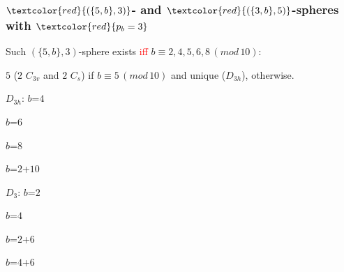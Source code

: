 \documentclass{beamer}
\begin{document}
\begin{frame}\frametitle{$\textcolor{red}{(\{5,b\},3)}$- 
and $\textcolor{red}{(\{3,b\},5)}$-spheres with
$\textcolor{red}{p_b=3}$}
\vspace{-3mm}
  
Such ${(\{5,b\},3)}$-sphere  exists
\textcolor{red}{iff}
$b\equiv 2,4,5,6,8\,(mod\,10)$:  

$5$ ($2$ $C_{3v}$ and $2$ $C_s$) if $b\equiv 
5\,(mod\,10)$
and unique ($D_{3h}$), otherwise.



\begin{center}
\begin{minipage}[b]{19mm}
\centering
{}\par
$D_{3h}$: $b$=$4$ 
\end{minipage}
\begin{minipage}[b]{19mm}
\centering
{}\par
$b$=$6$ 
\end{minipage}
\begin{minipage}[b]{19mm}
\centering   
{}\par
$b$=$8$ 
\end{minipage}
\begin{minipage}[b]{19mm}
\centering
{}\par
$b$=$2$+$10$ 
\end{minipage}
\end{center}

\begin{center}
\begin{minipage}[b]{19mm}
\centering
{}\par
$D_3$: $b$=$2$
\end{minipage}
\begin{minipage}[b]{19mm}
\centering
{}\par
$b$=$4$
\end{minipage}
\begin{minipage}[b]{19mm}
\centering
{}\par
$b$=$2$+$6$
\end{minipage}
\begin{minipage}[b]{19mm}
\centering
{}\par
$b$=$4$+$6$
\end{minipage}
\end{center}


\end{frame}
\end{document}

